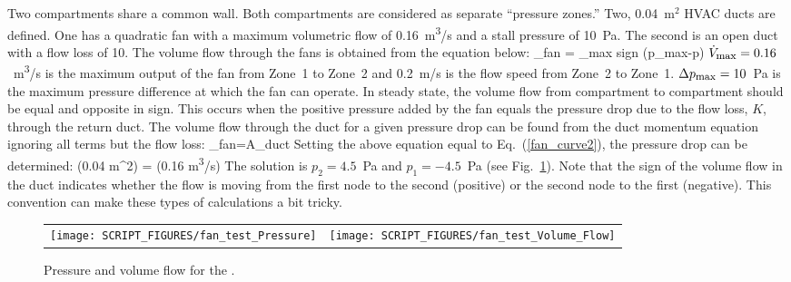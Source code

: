 \documentclass[11pt]{book}
\begin{document}
Two compartments share a common wall. Both compartments are considered as separate ``pressure zones.'' Two, 0.04~m$^2$ HVAC ducts are defined.  One has a quadratic fan with a maximum volumetric flow of 0.16~\si{m^3/s} and a stall pressure of 10~Pa. The second is an open duct with a flow loss of 10. The volume flow through the fans is obtained from the equation below:
\be
   _{\hbox{\footnotesize fan}} = _{\hbox{\footnotesize max}} \; \hbox{sign} (\Delta p_{\hbox{\footnotesize max}}-\Delta p)   \label{fan_curve2}
\ee
$\dot{V}_{\hbox{\footnotesize max}}=0.16$~\si{m^3/s} is the maximum output of the fan from Zone~1 to Zone~2 and 0.2~m/s is the flow speed from Zone~2 to Zone~1. $\Delta p_{\hbox{\footnotesize max}}=10$~Pa is the maximum pressure difference at which the fan can operate. In steady state, the volume flow from compartment to compartment should be equal and opposite in sign. This occurs when the positive pressure added by the fan equals the pressure drop due to the flow loss, $K$, through the return duct.  The volume flow through the duct for a given pressure drop can be found from the duct momentum equation ignoring all terms but the flow loss:
\be
   _{\hbox{\footnotesize fan}}=A_{\hbox{\footnotesize duct}} 
\ee
Setting the above equation equal to Eq.~(\ref{fan_curve2}), the pressure drop can be determined:
\be
    (0.04 \; \hbox{m}^2) = (0.16 \; \hbox{\si{m^3/s}})  \; 
\ee
The solution is $p_2=4.5$~Pa and $p_1=-4.5$~Pa (see Fig.~\ref{fan_test_fig}). Note that the sign of the volume flow in the duct indicates whether the flow is moving from the first node to the second (positive) or the second node to the first (negative). This convention can make these types of calculations a bit tricky.

\begin{figure}[ht]
\begin{tabular*}{\textwidth}{lr}
\texttt{[image: SCRIPT\_FIGURES/fan\_test\_Pressure]} &
\texttt{[image: SCRIPT\_FIGURES/fan\_test\_Volume\_Flow]}
\end{tabular*}
\caption[Results of the  case]{Pressure and volume flow for the .}
\label{fan_test_fig}
\end{figure}

\clearpage
\end{document}
